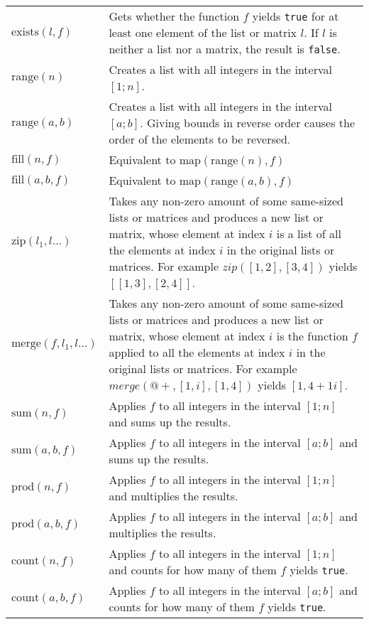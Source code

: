 \documentclass[10pt]{article}
\newcommand{\tabgap}{\vspace{3mm}\\}
\begin{document}
\begin{longtable}{p{}p{}}
        $ \mathrm{exists}(l, f) $                  & Gets whether the function $ f $ yields \verb|true| for at least one element of the list or matrix $ l $. If $ l $ is neither a list nor a matrix, the result is \verb|false|. \tabgap
        $ \mathrm{range}(n) $                      & Creates a list with all integers in the interval $ [1;n] $. \\
        $ \mathrm{range}(a, b) $                   & Creates a list with all integers in the interval $ [a;b] $. Giving bounds in reverse order causes the order of the elements to be reversed. \\
        $ \mathrm{fill}(n, f) $                    & Equivalent to $ \mathrm{map}(\mathrm{range}(n), f) $ \\
        $ \mathrm{fill}(a, b, f) $                 & Equivalent to $ \mathrm{map}(\mathrm{range}(a, b), f) $ \tabgap
        $ \mathrm{zip}(l_1, l\dots) $              & Takes any non-zero amount of some same-sized lists or matrices and produces a new list or matrix, whose element at index $ i $ is a list of all the elements at index $ i $ in the original lists or matrices. For example $ zip([1,2],[3,4]) $ yields $ [[1,3],[2,4]] $. \\
        $ \mathrm{merge}(f, l_1, l\dots) $         & Takes any non-zero amount of some same-sized lists or matrices and produces a new list or matrix, whose element at index $ i $ is the function $ f $ applied to all the elements at index $ i $ in the original lists or matrices. For example $ merge({@+},[1,i],[1,4]) $ yields $ [1, 4 + 1i] $. \tabgap
        $ \mathrm{sum}(n, f) $                     & Applies $ f $ to all integers in the interval $ [1;n] $ and sums up the results. \\
        $ \mathrm{sum}(a, b, f) $                  & Applies $ f $ to all integers in the interval $ [a;b] $ and sums up the results. \\
        $ \mathrm{prod}(n, f) $                    & Applies $ f $ to all integers in the interval $ [1;n] $ and multiplies the results. \\
        $ \mathrm{prod}(a, b, f) $                 & Applies $ f $ to all integers in the interval $ [a;b] $ and multiplies the results. \\
        $ \mathrm{count}(n, f) $                   & Applies $ f $ to all integers in the interval $ [1;n] $ and counts for how many of them $ f $ yields \verb|true|. \\
        $ \mathrm{count}(a, b, f) $                & Applies $ f $ to all integers in the interval $ [a;b] $ and counts for how many of them $ f $ yields \verb|true|. \tabgap

\end{longtable}
\end{document}
